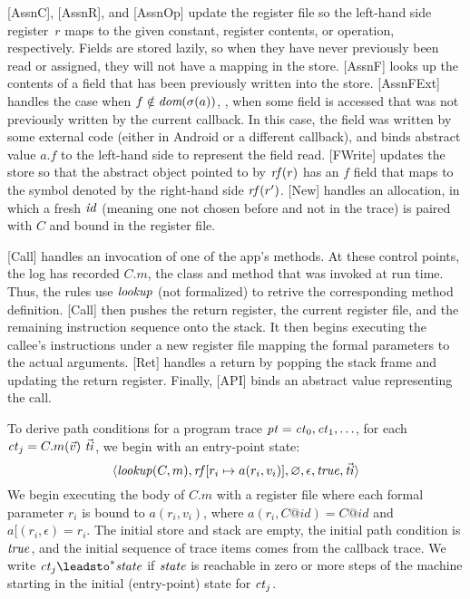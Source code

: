 [AssnC], [AssnR], and [AssnOp] update the register file so the
left-hand side register~$r$ maps to the given constant, register
contents, or operation, respectively. Fields are stored lazily, so
when they have never previously been read or assigned, they will not
have a mapping in the store.  [AssnF] looks up the contents of a field
that has been previously written into the store. [AssnFExt] handles
the case when $f\notin\mathop\textit{dom}\nolimits(\sigma(a))$, \ie, when some field is
accessed that was not previously written by the current callback. In
this case, the field was written by some external code (either in Android
or a different callback), and \hogarth{} binds abstract value
$a.f$ to the left-hand side to represent the field read.
[FWrite] updates the store so that the abstract object pointed to
by $\mathit{rf}(r)$ has an $f$ field that maps to the symbol denoted by the right-hand side
$\mathit{rf}(r')$. [New] handles an allocation, in which a fresh $\mathit{id}$
(meaning one not chosen before and not in the trace) is paired with
$C$ and bound in the register file.

[Call] handles an invocation of one of the app's methods. At these control
points, the log has recorded $C.m$, the class and method that was
invoked at run time. Thus, the rules use $\mathit{lookup}$ (not
formalized) to
retrive the corresponding method definition. [Call] then pushes the return
register, the current register file, and the remaining instruction
sequence onto the stack. It then begins executing the callee's
instructions under a new register file mapping the formal parameters
to the actual arguments. [Ret] handles a return by popping
the stack frame and updating the return register. Finally, [API]
binds an abstract value representing the call.

To derive path conditions for a program trace
$\mathit{pt} = \mathit{ct}_0, \mathit{ct}_1, \ldots$, for each
$\var{ct}_j = C.m(\vec{v})\ \vec{\var{ti}}$, we begin with an entry-point state:
\begin{displaymath}
\langle \mathit{lookup}(C,m), \mathit{rf}[r_i \mapsto a(r_i, v_i)], \varnothing,
\epsilon, \mathit{true}, \vec{\mathit{ti}} \rangle
\end{displaymath}
We begin executing the body of $C.m$ with a register file where each
formal parameter $r_i$ is bound to $a(r_i, v_i)$, where
$a(r_i, C@id) = C@id$ and $a[(r_i, \epsilon) = r_i$. The initial
store and stack are empty, the initial path condition is $\mathit{true}$,
and the initial sequence of trace items comes from the callback trace.
We write $\var{ct}_j \leadsto^* \var{state}$ if $\mathit{state}$ is
reachable in zero or more steps of the machine starting in the initial
(entry-point) state for $\mathit{ct}_j$.

